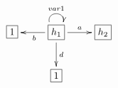 $\xymatrix{
   \fbox{$1$} & \fbox{$h_1$} \ar@(ul,ur)^{var1} \ar[l]^{b} \ar[d]^{d} \ar[r]^{a} & \fbox{$h_2$} \\
   & \fbox{$1$}
}$
